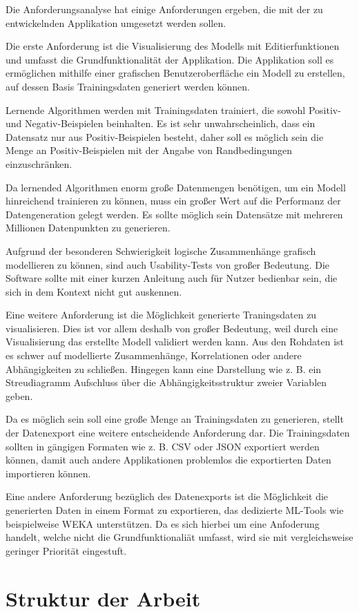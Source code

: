 Die Anforderungsanalyse hat einige Anforderungen ergeben, die mit der zu entwickelnden Applikation umgesetzt werden sollen.

Die erste Anforderung ist die Visualisierung des Modells mit Editierfunktionen und umfasst die Grundfunktionalität der Applikation. Die Applikation soll es ermöglichen mithilfe einer grafischen Benutzeroberfläche ein Modell zu erstellen, auf dessen Basis Trainingsdaten generiert werden können.

Lernende Algorithmen werden mit Trainingsdaten trainiert, die sowohl Positiv- und Negativ-Beispielen beinhalten. Es ist sehr unwahrscheinlich, dass ein Datensatz nur aus Positiv-Beispielen besteht, daher soll es möglich sein die Menge an Positiv-Beispielen mit der Angabe von Randbedingungen einzuschränken. 

Da lernended Algorithmen enorm große Datenmengen benötigen, um ein Modell hinreichend trainieren zu können, muss ein großer Wert auf die Performanz der Datengeneration gelegt werden. Es sollte möglich sein Datensätze mit mehreren Millionen Datenpunkten zu generieren.

Aufgrund der besonderen Schwierigkeit logische Zusammenhänge grafisch modellieren zu können, sind auch Usability-Tests von großer Bedeutung. Die Software sollte mit einer kurzen Anleitung auch für Nutzer bedienbar sein, die sich in dem Kontext nicht gut auskennen.

Eine weitere Anforderung ist die Möglichkeit generierte Traningsdaten zu visualisieren. Dies ist vor allem deshalb von großer Bedeutung, weil durch eine Visualisierung das erstellte Modell validiert werden kann. Aus den Rohdaten ist es schwer auf modellierte Zusammenhänge, Korrelationen oder andere Abhängigkeiten zu schließen. Hingegen kann eine Darstellung wie z. B. ein Streudiagramm Aufschluss über die Abhängigkeitsstruktur zweier Variablen geben.

Da es möglich sein soll eine große Menge an Trainingsdaten zu generieren, stellt der Datenexport eine weitere entscheidende Anforderung dar. Die Trainingsdaten sollten in gängigen Formaten wie z. B. CSV oder JSON exportiert werden können, damit auch andere Applikationen problemlos die exportierten Daten importieren können.

Eine andere Anforderung bezüglich des Datenexports ist die Möglichkeit die generierten Daten in einem Format zu exportieren, das dedizierte ML-Tools wie beispielweise WEKA unterstützen. Da es sich hierbei um eine Anfoderung handelt, welche nicht die Grundfunktionaliät umfasst, wird sie mit vergleichsweise geringer Priorität eingestuft.

\section{Struktur der Arbeit}


